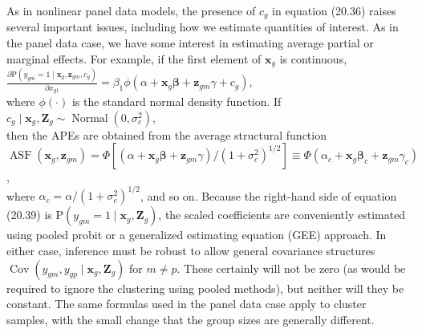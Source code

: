 \documentclass[10pt]{article}
\begin{document}
As in nonlinear panel data models, the presence of $c_{g}$ in equation (20.36) raises several important issues, including how we estimate quantities of interest. As in the panel data case, we have some interest in estimating average partial or marginal effects. For example, if the first element of $\mathbf{x}_{g}$ is continuous,\\
$\frac{\partial \mathrm{P}\left(y_{g m}=1 \mid \mathbf{x}_{g}, \mathbf{z}_{g m}, c_{g}\right)}{\partial x_{g 1}}=\beta_{1} \phi\left(\alpha+\mathbf{x}_{g} \boldsymbol{\beta}+\mathbf{z}_{g m} \gamma+c_{g}\right)$,\\
where $\phi(\cdot)$ is the standard normal density function. If\\
$c_{g} \mid \mathbf{x}_{g}, \mathbf{Z}_{g} \sim \operatorname{Normal}\left(0, \sigma_{c}^{2}\right)$,\\
then the APEs are obtained from the average structural function\\
$\operatorname{ASF}\left(\mathbf{x}_{g}, \mathbf{z}_{g m}\right)=\Phi\left[\left(\alpha+\mathbf{x}_{g} \boldsymbol{\beta}+\mathbf{z}_{g m} \gamma\right) /\left(1+\sigma_{c}^{2}\right)^{1 / 2}\right] \equiv \Phi\left(\alpha_{c}+\mathbf{x}_{g} \boldsymbol{\beta}_{c}+\mathbf{z}_{g m} \gamma_{c}\right)$,\\
where $\alpha_{c}=\alpha /\left(1+\sigma_{c}^{2}\right)^{1 / 2}$, and so on. Because the right-hand side of equation (20.39) is $\mathrm{P}\left(y_{g m}=1 \mid \mathbf{x}_{g}, \mathbf{Z}_{g}\right)$, the scaled coefficients are conveniently estimated using pooled probit or a generalized estimating equation (GEE) approach. In either case, inference must be robust to allow general covariance structures $\operatorname{Cov}\left(y_{g m}, y_{g p} \mid \mathbf{x}_{g}, \mathbf{Z}_{g}\right)$ for $m \neq p$. These certainly will not be zero (as would be required to ignore the clustering using pooled methods), but neither will they be constant. The same formulas used in the panel data case apply to cluster samples, with the small change that the group sizes are generally different.
\end{document}
